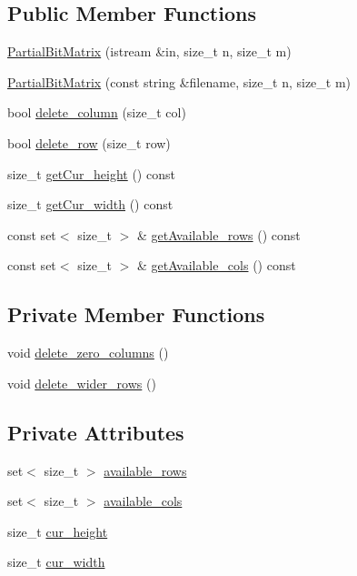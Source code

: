 \subsection*{Public Member Functions}
\begin{DoxyCompactItemize}
\item 
\hyperlink{classPartialBitMatrix_a0bdc388b54ece3f0af522140f1d8fa3f}{Partial\+Bit\+Matrix} (istream \&in, size\+\_\+t n, size\+\_\+t m)
\item 
\hyperlink{classPartialBitMatrix_a9c57752eb3d83c96694d6016ab51b93f}{Partial\+Bit\+Matrix} (const string \&filename, size\+\_\+t n, size\+\_\+t m)
\item 
bool \hyperlink{classPartialBitMatrix_a14711125645f4395fbf834ba10e7e538}{delete\+\_\+column} (size\+\_\+t col)
\item 
bool \hyperlink{classPartialBitMatrix_a29612f1d11f0e53c889b23ec9db445ba}{delete\+\_\+row} (size\+\_\+t row)
\item 
size\+\_\+t \hyperlink{classPartialBitMatrix_ac6e4c5182f8c04323cd2fde465021756}{get\+Cur\+\_\+height} () const
\item 
size\+\_\+t \hyperlink{classPartialBitMatrix_a9bd1557769214ae8442b57c561015a96}{get\+Cur\+\_\+width} () const
\item 
const set$<$ size\+\_\+t $>$ \& \hyperlink{classPartialBitMatrix_ab3ffe36bd4034cb0b28f53064bde5309}{get\+Available\+\_\+rows} () const
\item 
const set$<$ size\+\_\+t $>$ \& \hyperlink{classPartialBitMatrix_ab6d7d19a7c87ec6c397b336121f37712}{get\+Available\+\_\+cols} () const
\end{DoxyCompactItemize}
\subsection*{Private Member Functions}
\begin{DoxyCompactItemize}
\item 
void \hyperlink{classPartialBitMatrix_ab0e8e1dc7a71ab0b9203fd13bc748c0f}{delete\+\_\+zero\+\_\+columns} ()
\item 
void \hyperlink{classPartialBitMatrix_a9e08f3b006f85bcec3853a1df320decd}{delete\+\_\+wider\+\_\+rows} ()
\end{DoxyCompactItemize}
\subsection*{Private Attributes}
\begin{DoxyCompactItemize}
\item 
set$<$ size\+\_\+t $>$ \hyperlink{classPartialBitMatrix_a424c7cd6f2af62cf9356e53a7898c051}{available\+\_\+rows}
\item 
set$<$ size\+\_\+t $>$ \hyperlink{classPartialBitMatrix_a1c44d05b37ba0acb4fbf05ae39d44de3}{available\+\_\+cols}
\item 
size\+\_\+t \hyperlink{classPartialBitMatrix_ad6f7fd9eb7ecd63d44419c8388cdebf1}{cur\+\_\+height}
\item 
size\+\_\+t \hyperlink{classPartialBitMatrix_a5684506338c5c27b8936f42e34107267}{cur\+\_\+width}
\end{DoxyCompactItemize}
